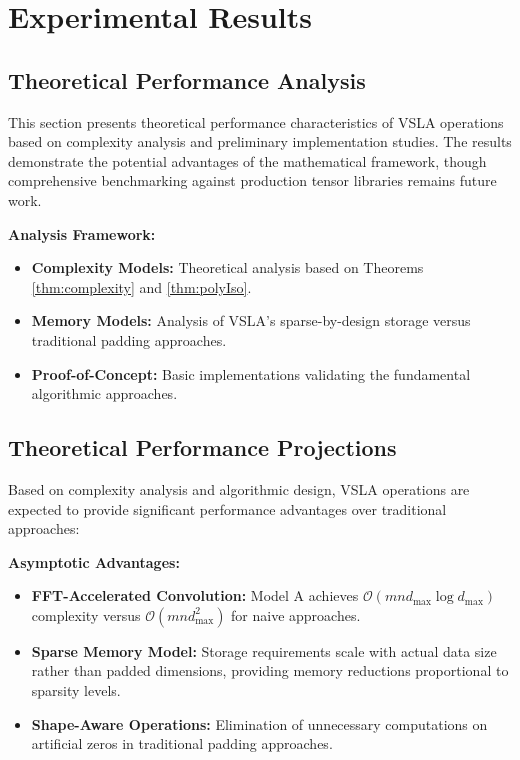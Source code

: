 \section{Experimental Results}
\label{sec:evaluation}

\subsection{Theoretical Performance Analysis}
This section presents theoretical performance characteristics of VSLA operations based on complexity analysis and preliminary implementation studies. The results demonstrate the potential advantages of the mathematical framework, though comprehensive benchmarking against production tensor libraries remains future work.

\textbf{Analysis Framework:}
\begin{itemize}[leftmargin=1.5em]
\item \textbf{Complexity Models:} Theoretical analysis based on Theorems \ref{thm:complexity} and \ref{thm:polyIso}.
\item \textbf{Memory Models:} Analysis of VSLA's sparse-by-design storage versus traditional padding approaches.
\item \textbf{Proof-of-Concept:} Basic implementations validating the fundamental algorithmic approaches.
\end{itemize}

\subsection{Theoretical Performance Projections}

Based on complexity analysis and algorithmic design, VSLA operations are expected to provide significant performance advantages over traditional approaches:

\textbf{Asymptotic Advantages:}
\begin{itemize}[leftmargin=1.5em]
\item \textbf{FFT-Accelerated Convolution:} Model A achieves $\mathcal{O}(mn d_{\max} \log d_{\max})$ complexity versus $\mathcal{O}(mn d_{\max}^2)$ for naive approaches.
\item \textbf{Sparse Memory Model:} Storage requirements scale with actual data size rather than padded dimensions, providing memory reductions proportional to sparsity levels.
\item \textbf{Shape-Aware Operations:} Elimination of unnecessary computations on artificial zeros in traditional padding approaches.
\end{itemize}


